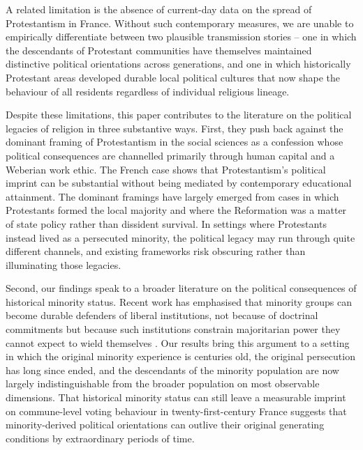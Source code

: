 \documentclass[12pt]{article}
\begin{document}
A related limitation is the absence of current-day data on the spread of Protestantism in France. Without such contemporary measures, we are unable to empirically differentiate between two plausible transmission stories -- one in which the descendants of Protestant communities have themselves maintained distinctive political orientations across generations, and one in which historically Protestant areas developed durable local political cultures that now shape the behaviour of all residents regardless of individual religious lineage.

Despite these limitations, this paper contributes to the literature on the political legacies of religion in three substantive ways. First, they push back against the dominant framing of Protestantism in the social sciences as a confession whose political consequences are channelled primarily through human capital and a Weberian work ethic. The French case shows that Protestantism's political imprint can be substantial without being mediated by contemporary educational attainment. The dominant framings have largely emerged from cases in which Protestants formed the local majority and where the Reformation was a matter of state policy rather than dissident survival. In settings where Protestants instead lived as a persecuted minority, the political legacy may run through quite different channels, and existing frameworks risk obscuring rather than illuminating those legacies.

Second, our findings speak to a broader literature on the political consequences of historical minority status. Recent work has emphasised that minority groups can become durable defenders of liberal institutions, not because of doctrinal commitments but because such institutions constrain majoritarian power they cannot expect to wield themselves \parencite{rovnyAntidoteBackslidingEthnic2023, rovnyEthnicMinoritiesPolitical2024, braunProtectorsPluralismReligious2019}. Our results bring this argument to a setting in which the original minority experience is centuries old, the original persecution has long since ended, and the descendants of the minority population are now largely indistinguishable from the broader population on most observable dimensions. That historical minority status can still leave a measurable imprint on commune-level voting behaviour in twenty-first-century France suggests that minority-derived political orientations can outlive their original generating conditions by extraordinary periods of time.
\end{document}
